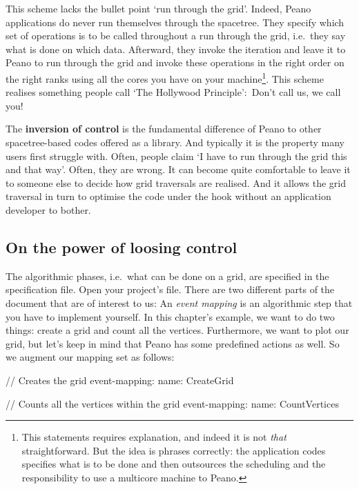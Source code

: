 This scheme lacks the bullet point `run through the grid'. 
Indeed, Peano applications do never run themselves through the spacetree.
They specify which set of operations is to be called throughout a run through
the grid, i.e.~they say what is done on which data.
Afterward, they invoke the iteration and leave it to Peano to run through the
grid and invoke these operations in the right order on the right ranks using all
the cores you have on your machine\footnote{This statements requires
explanation, and indeed it is not {\em that} straightforward. But the idea is
phrases correctly: the application codes specifies what is to be done and then
outsources the scheduling and the responsibility to use a multicore machine to
Peano.}.
This scheme realises something people call `The Hollywood Principle': Don't
call us, we call you!


\begin{remark}
  The {\bf inversion of control} is the fundamental difference of Peano to other
  spacetree-based codes offered as a library. 
  And typically it is the property many users first struggle with.
  Often, people claim `I have to run through the grid this and that way'. 
  Often, they are wrong.
  It can become quite comfortable to leave it to someone else to decide how 
  grid traversals are realised.
  And it allows the grid traversal in turn to optimise the code under the hook
  without an application developer to bother.
\end{remark}


\subsection{On the power of loosing control}

The algorithmic phases, i.e.~what can be done on a grid, are specified in the
specification file.
Open your project's file. 
There are two different parts of the document that are of interest to us:
An {\em event mapping} is an algorithmic step that you have to implement
yourself.
In this chapter's example, we want to do two things: create a grid and count all
the vertices. 
Furthermore, we want to plot our grid, but let's keep in mind that Peano has
some predefined actions as well.
So we augment our mapping set as follows:

\begin{code}
// Creates the grid
event-mapping:
  name: CreateGrid

// Counts all the vertices within the grid
event-mapping:
  name: CountVertices
\end{code}

